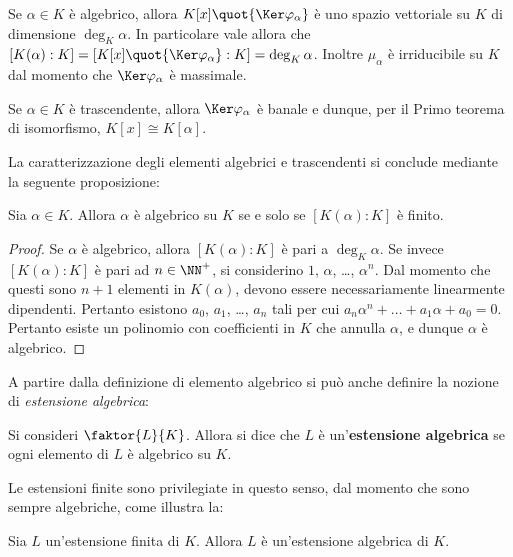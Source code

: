 \documentclass[12pt]{scrartcl}
\begin{document}
	\begin{remark}
		Se $\alpha \in K$ è algebrico, allora $K[x] \quot{\Ker \varphi_\alpha}$ è uno spazio vettoriale su $K$ di
		dimensione $\deg_K \alpha$. In particolare vale allora
		che $[K(\alpha) : K] = [K[x] \quot{\Ker \varphi_\alpha} : K] = \deg_K \alpha$. Inoltre $\mu_\alpha$ è irriducibile su $K$ dal momento che $\Ker \varphi_\alpha$ è massimale.
	\end{remark}

	\begin{remark}
		Se $\alpha \in K$ è trascendente, allora
		$\Ker \varphi_\alpha$ è banale e dunque, per il Primo
		teorema di isomorfismo, $K[x] \cong K[\alpha]$.
	\end{remark}

	La caratterizzazione degli elementi algebrici e trascendenti
	si conclude mediante la seguente proposizione:
	
	\begin{proposition}
		Sia $\alpha \in K$. Allora $\alpha$ è algebrico su
		$K$ se e solo se $[K(\alpha) : K]$ è finito.
	\end{proposition}

	\begin{proof}
		Se $\alpha$ è algebrico, allora $[K(\alpha) : K]$ 
		è pari a $\deg_K \alpha$. Se invece $[K(\alpha) : K]$
		è pari ad $n \in \NN^+$, si considerino $1$, $\alpha$,
		\ldots, $\alpha^n$. Dal momento che questi sono
		$n+1$ elementi in $K(\alpha)$, devono essere
		necessariamente linearmente dipendenti. Pertanto
		esistono $a_0$, $a_1$, \ldots, $a_n$ tali per
		cui $a_n \alpha^n + \ldots + a_1 \alpha + a_0 = 0$.
		Pertanto esiste un polinomio con coefficienti in $K$
		che annulla $\alpha$, e dunque $\alpha$ è algebrico. 
	\end{proof}

	A partire dalla definizione di elemento algebrico si può
	anche definire la nozione di \textit{estensione algebrica}:
	
	\begin{definition}
		Si consideri $\faktor{L}{K}$. Allora si dice che
		$L$ è un'\textbf{estensione algebrica} se ogni
		elemento di $L$ è algebrico su $K$.
	\end{definition}

	Le estensioni finite sono privilegiate in questo senso,
	dal momento che sono sempre algebriche, come illustra la:
	
	\begin{proposition}
		Sia $L$ un'estensione finita di $K$. Allora $L$
		è un'estensione algebrica di $K$.
	\end{proposition}
\end{document}
